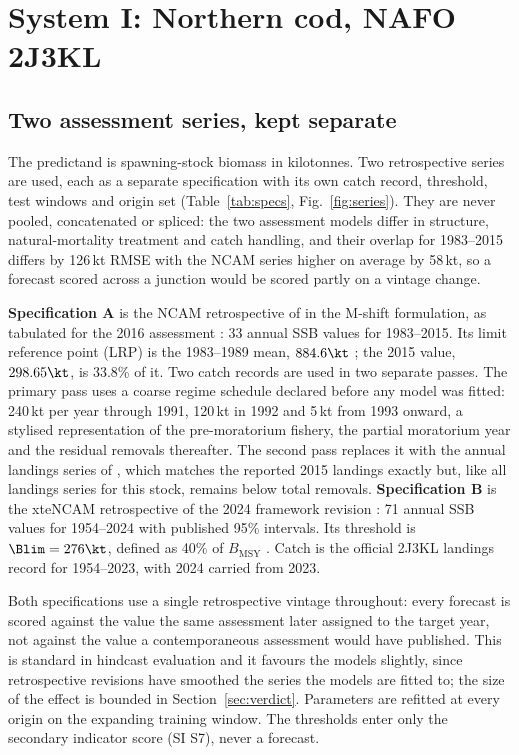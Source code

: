 \FloatBarrier
\section{System I: Northern cod, NAFO 2J3KL}\label{sec:cod}

\subsection{Two assessment series, kept separate}\label{sec:specs}

The predictand is spawning-stock biomass in kilotonnes. Two retrospective series are used, each as a separate specification with its own catch record, threshold, test windows and origin set (Table~\ref{tab:specs}, Fig.~\ref{fig:series}). They are never pooled, concatenated or spliced: the two assessment models differ in structure, natural-mortality treatment and catch handling, and their overlap for 1983--2015 differs by 126\,kt RMSE with the NCAM series higher on average by 58\,kt, so a forecast scored across a junction would be scored partly on a vintage change.

\textbf{Specification A} is the NCAM retrospective of \citet{Cadigan2016} in the M-shift formulation, as tabulated for the 2016 assessment \citep[Table A2]{DFO2016}: 33 annual SSB values for 1983--2015. Its limit reference point (LRP) is the 1983--1989 mean, $884.6\kt$ \citep{DFO2009,DFO2016}; the 2015 value, $298.65\kt$, is 33.8\% of it. Two catch records are used in two separate passes. The primary pass uses a coarse regime schedule declared before any model was fitted: 240\,kt per year through 1991, 120\,kt in 1992 and 5\,kt from 1993 onward, a stylised representation of the pre-moratorium fishery, the partial moratorium year and the residual removals thereafter. The second pass replaces it with the annual landings series of \citet{Schijns2021}, which matches the reported 2015 landings exactly but, like all landings series for this stock, remains below total removals. \textbf{Specification B} is the xteNCAM retrospective of the 2024 framework revision \citep[Table 17]{Regular2025}: 71 annual SSB values for 1954--2024 with published 95\% intervals. Its threshold is $\Blim = 276\kt$, defined as 40\% of $B_{\mathrm{MSY}}$ \citep{DFO2024a}. Catch is the official 2J3KL landings record \citep[Table 1]{Regular2025} for 1954--2023, with 2024 carried from 2023.

Both specifications use a single retrospective vintage throughout: every forecast is scored against the value the same assessment later assigned to the target year, not against the value a contemporaneous assessment would have published. This is standard in hindcast evaluation and it favours the models slightly, since retrospective revisions have smoothed the series the models are fitted to; the size of the effect is bounded in Section~\ref{sec:verdict}. Parameters are refitted at every origin on the expanding training window. The thresholds enter only the secondary indicator score (SI S7), never a forecast.

